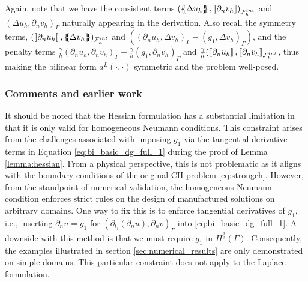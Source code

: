                                      \begin{remark}
Again, note that we have the consistent terms $\left( \left\{\!\!\left\{  \Delta  u_{h} \right\}\!\!\right\}, \left[\!\left[  \partial _{n }v_{h} \right]\!\right] \right)_{\mathcal{F}_{h}^{int}} $ and $ \left(   \Delta  u_{h} ,  \partial _{n }v_{h} \right)_{\Gamma }$ naturally appearing in the
derivation. Also recall the symmetry terms, $(  \left[\!\left[  \partial _{n} u_{h}  \right]\!\right], \left\{\!\!\left\{ \Delta  v_{h} \right\}\!\!\right\})_{\mathcal{F}^{int}_{h} } $ and $( (  \partial _{n} u_{h}, \Delta  v_{h}       )_{\Gamma  } -(  g_{1}, \Delta  v_{h}  )_{\Gamma  }   )$, and
the penalty terms $ \frac{\gamma }{h} (  \partial _{n} u_{h}, \partial _{n}   v_{h}       )_{\Gamma  } -\frac{\gamma }{h}(  g_{1}, \partial _{n} v_{h}  )_{\Gamma  }$ and $\frac{\gamma }{h}( \left[\!\left[  \partial _{n} u_{h}  \right]\!\right] , \left[\!\left[  \partial _{n} v_{h}  \right]\!\right]
_{\mathcal{F}^{int}_{h} }  $, thus making the bilinear form $a^{L}( \cdot,\cdot ) $  symmetric and the problem well-posed.
                                     \end{remark}

\subsubsection{Comments and earlier work}%
\label{ssub:remarks}

It should be noted that the Hessian formulation has a substantial limitation in that it is only valid for homogeneous Neumann conditions. This constraint arises from the challenges associated with imposing $g_{1}$ via the tangential derivative terms
in Equation \eqref{eq:bi_basic_dg_full_1} during the proof of Lemma \ref{lemma:hessian}.
From a physical perspective, this is not problematic as it aligns with the boundary conditions of the original CH problem \eqref{eq:strongch}. However, from the standpoint of numerical validation, the homogeneous Neumann condition enforces strict
rules on the design of manufactured solutions on arbitrary domains. One way to fix this is to enforce tangential derivatives of $g_{1}$, i.e., inserting $\partial _{n}u = g_{1}$ for $ ( \partial _{t_{i}}( \partial_{n}  u ) , \partial _{n} v)_\Gamma  $ into
\eqref{eq:bi_basic_dg_full_1}. A downside with this method is that we must require $g_{1}$ in $ H^{\frac{3}{2}}( \Gamma ) $.
Consequently, the examples illustrated in section \ref{sec:numerical_results} are only demonstrated on simple domains. This particular constraint does not apply to the Laplace formulation.

